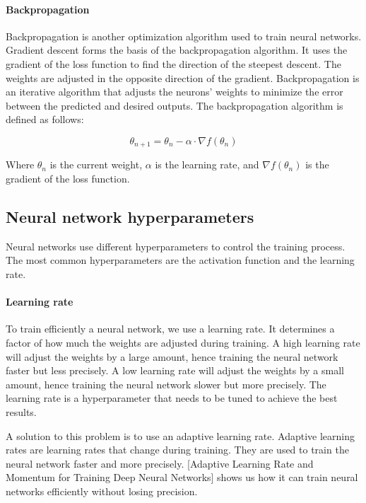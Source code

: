 \paragraph{Backpropagation}

Backpropagation is another optimization algorithm used to train neural networks. Gradient descent forms the basis of the backpropagation algorithm. It uses the gradient of the loss function to find the direction of the steepest descent. The weights are adjusted in the opposite direction of the gradient. Backpropagation is an iterative algorithm that adjusts the neurons' weights to minimize the error between the predicted and desired outputs. The backpropagation algorithm is defined as follows:

\begin{equation}
    \theta_{n+1} = \theta_{n} - \alpha \cdot \nabla f(\theta_{n})
\end{equation}

Where $\theta_{n}$ is the current weight, $\alpha$ is the learning rate, and $\nabla f(\theta_{n})$ is the gradient of the loss function.

\subsection{Neural network hyperparameters}
Neural networks use different hyperparameters to control the training process. The most common hyperparameters are the activation function and the learning rate.


\paragraph{Learning rate}

To train efficiently a neural network, we use a learning rate. It determines a factor of how much the weights are adjusted during training. A high learning rate will adjust the weights by a large amount, hence training the neural network faster but less precisely. A low learning rate will adjust the weights by a small amount, hence training the neural network slower but more precisely. The learning rate is a hyperparameter that needs to be tuned to achieve the best results.

A solution to this problem is to use an adaptive learning rate. Adaptive learning rates are learning rates that change during training. They are used to train the neural network faster and more precisely. [Adaptive Learning Rate and Momentum for Training Deep Neural Networks]\cite{hao2021adaptive} shows us how it can train neural networks efficiently without losing precision. 

